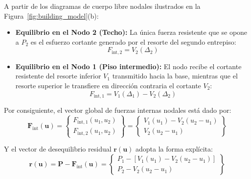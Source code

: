 \documentclass[11pt,letterpaper]{article}
\begin{document}
A partir de los diagramas de cuerpo libre nodales ilustrados en la Figura~\ref{fig:building_model}(b):
\begin{itemize}
    \item \textbf{Equilibrio en el Nodo 2 (Techo):} La única fuerza resistente que se opone a $P_2$ es el esfuerzo cortante generado por el resorte del segundo entrepiso:
    \begin{equation}
        F_{\text{int},2} = V_2(\Delta_2)
    \end{equation}
    
    \item \textbf{Equilibrio en el Nodo 1 (Piso intermedio):} El nodo recibe el cortante resistente del resorte inferior $V_1$ transmitido hacia la base, mientras que el resorte superior le transfiere en dirección contraria el cortante $V_2$:
    \begin{equation}
        F_{\text{int},1} = V_1(\Delta_1) - V_2(\Delta_2)
    \end{equation}
\end{itemize}

Por consiguiente, el vector global de fuerzas internas nodales está dado por:
\begin{equation}
    \label{eq:Fint_vector}
    \mathbf{F}_{\text{int}}(\mathbf{u}) = 
    \begin{Bmatrix} 
        F_{\text{int},1}(u_1, u_2) \\ 
        F_{\text{int},2}(u_1, u_2) 
    \end{Bmatrix} = 
    \begin{Bmatrix} 
        V_1(u_1) - V_2(u_2 - u_1) \\ 
        V_2(u_2 - u_1) 
    \end{Bmatrix}
\end{equation}

Y el vector de desequilibrio residual $\mathbf{r}(\mathbf{u})$ adopta la forma explícita:
\begin{equation}
    \label{eq:residual_vector}
    \mathbf{r}(\mathbf{u}) = \mathbf{P} - \mathbf{F}_{\text{int}}(\mathbf{u}) = 
    \begin{Bmatrix} 
        P_1 - \left[ V_1(u_1) - V_2(u_2 - u_1) \right] \\ 
        P_2 - V_2(u_2 - u_1) 
    \end{Bmatrix}
\end{equation}

\end{document}
